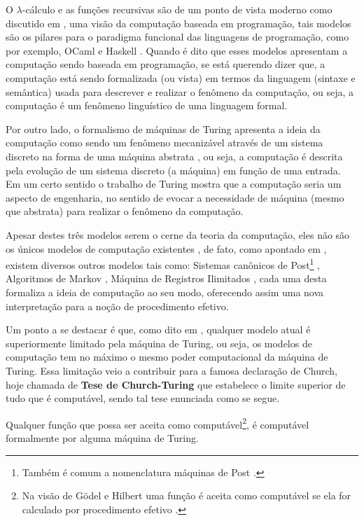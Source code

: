 O $\lambda$-cálculo e as funções recursivas \cite{fitting2011, odifreddi1992, cutland1980} são de um ponto de vista moderno como discutido em \cite{hankin2004}, uma visão da computação baseada em programação, tais modelos são os pilares para o paradigma funcional das linguagens de programação, como por exemplo, OCaml e Haskell \cite{hankin2004}. Quando é dito que esses modelos apresentam a computação sendo baseada em programação, se está querendo dizer que, a computação está sendo formalizada (ou vista) em termos da linguagem (sintaxe e semântica) usada para descrever e realizar o fenômeno da computação, ou seja, a computação é um fenômeno linguístico de uma linguagem formal. 

Por outro lado, o formalismo de máquinas de Turing apresenta a ideia da computação como sendo um fenômeno mecanizável através de um sistema discreto na forma de uma máquina abstrata \cite{sernadas2006, hankin2004}, ou seja, a computação é descrita pela evolução de um sistema discreto (a máquina) em função de uma entrada. Em um certo sentido o trabalho de Turing mostra que a computação seria um aspecto de engenharia, no sentido de evocar a necessidade de máquina (mesmo que abstrata) para realizar o fenômeno da computação.

Apesar destes três modelos serem o cerne da teoria da computação, eles não são os únicos modelos de computação existentes \cite{roberto1998}, de fato, como apontado em \cite{menezes2003}, existem diversos outros modelos tais como: Sistemas canônicos de Post\footnote{Também é comum a nomenclatura máquinas de Post \cite{nelson1968}.} \cite{fitting2011}, Algoritmos de Markov \cite{menezes2003}, Máquina de Registros Ilimitados \cite{menezes2003, cutland1980}, cada uma desta formaliza a ideia de computação ao seu modo, oferecendo assim uma nova interpretação para a noção de procedimento efetivo. 

Um ponto a se destacar é que, como dito em \cite{sernadas2006}, qualquer modelo atual é superiormente limitado pela máquina de Turing, ou seja, os modelos de computação tem no máximo o mesmo poder computacional da máquina de Turing. Essa limitação veio a contribuir para a famosa declaração de Church, hoje chamada de \textbf{Tese de Church-Turing} que estabelece o limite superior de tudo que é computável, sendo tal tese enunciada como se segue.

\begin{tese}
	\cite{sernadas2006} Qualquer função que possa ser aceita como computável\footnote{Na visão de Gödel e Hilbert uma função é aceita como computável se ela for calculado por procedimento efetivo \cite{fonseca2007}.}, é computável formalmente por alguma máquina de Turing.
\end{tese}

